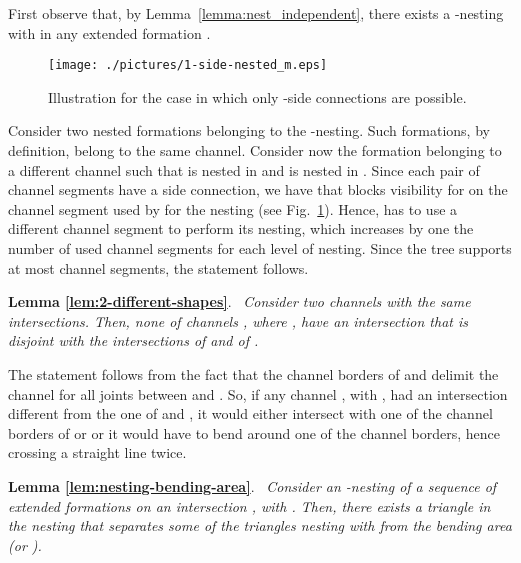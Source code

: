 \documentclass[a4paper,10pt]{llncs}
\renewenvironment{proof}
{{\bf Proof:}}{\hspace*{\fill}\par\vspace{2mm}}
\newcommand{\rephrase}[3]{\noindent\textbf{#1 #2}.~\emph{#3}}
\begin{document}
\begin{proof}
First observe that, by Lemma~\ref{lemma:nest_independent}, there exists a -nesting with  in any extended formation .

\begin{figure}[ht]
\begin{center}
\texttt{[image: ./pictures/1-side-nested\_m.eps]}
\caption{Illustration for the case in which only -side connections are possible.}
\label{fig:1-side-nested}
\end{center}
\end{figure}

Consider two nested formations  belonging to the -nesting. Such formations, by definition, belong to the same channel. Consider now the formation  belonging to a different channel such that  is nested in  and  is nested in . Since each pair of channel segments have a side connection, we have that  blocks visibility for  on the channel segment used by  for the nesting (see Fig.~\ref{fig:1-side-nested}). Hence,  has to use a different channel segment to perform its nesting, which increases by one the number of used channel segments for each level of nesting. Since the tree supports at most  channel segments, the statement follows.
\end{proof}

\rephrase{Lemma}{\ref{lem:2-different-shapes}}{
Consider two channels  with the same intersections. Then, none of channels , where , have an intersection that is disjoint with the intersections of  and of .
}

\begin{proof}
The statement follows from the fact that the channel borders of  and  delimit the channel for all joints between  and . So, if any channel , with , had an intersection different from the one of  and , it would either intersect with one of the channel borders of  or  or it would have to bend around one of the channel borders, hence crossing a straight line twice.
\end{proof}

\rephrase{Lemma}{\ref{lem:nesting-bending-area}}{
Consider an -nesting of a sequence of extended formations on an intersection , with .
Then, there exists a triangle  in the nesting that separates some of the triangles nesting with  from the bending area  (or ).
}
\end{document}
